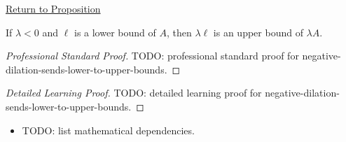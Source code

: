 \newpage
{}
\label{prf:negative-dilation-sends-lower-to-upper-bounds}

\begin{remark*}[Return]
\hyperref[prop:negative-dilation-sends-lower-to-upper-bounds]{Return to Proposition}
\end{remark*}

\begin{proposition*}
If $\lambda<0$ and $\ell$ is a lower bound of $A$, then $\lambda\ell$ is an
upper bound of $\lambda A$.
\end{proposition*}

\begin{proof}[Professional Standard Proof]
\LRAProofBodyStart
TODO: professional standard proof for negative-dilation-sends-lower-to-upper-bounds.
\end{proof}

\begin{proof}[Detailed Learning Proof]
\LRAProofBodyStart
TODO: detailed learning proof for negative-dilation-sends-lower-to-upper-bounds.
\end{proof}

\begin{remark*}
\end{remark*}

\begin{dependencies}
\begin{itemize}
  \item TODO: list mathematical dependencies.
\end{itemize}
\end{dependencies}

\clearpage
